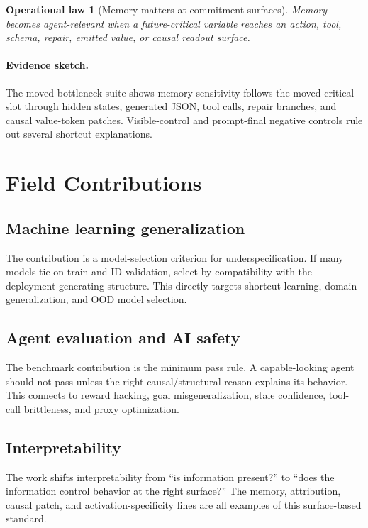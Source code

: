 \documentclass[11pt]{article}
\newtheorem{law}{Operational law}
\newenvironment{proofsketch}{\paragraph{Evidence sketch.}}{}
\begin{document}
\begin{law}[Memory matters at commitment surfaces]
Memory becomes agent-relevant when a future-critical variable reaches an
action, tool, schema, repair, emitted value, or causal readout surface.
\end{law}
\begin{proofsketch}
The moved-bottleneck suite shows memory sensitivity follows the moved critical
slot through hidden states, generated JSON, tool calls, repair branches, and
causal value-token patches. Visible-control and prompt-final negative controls
rule out several shortcut explanations.
\end{proofsketch}

\section{Field Contributions}

\subsection{Machine learning generalization}

The contribution is a model-selection criterion for underspecification. If
many models tie on train and ID validation, select by compatibility with the
deployment-generating structure. This directly targets shortcut learning,
domain generalization, and OOD model selection.

\subsection{Agent evaluation and AI safety}

The benchmark contribution is the minimum pass rule. A capable-looking agent
should not pass unless the right causal/structural reason explains its behavior.
This connects to reward hacking, goal misgeneralization, stale confidence,
tool-call brittleness, and proxy optimization.

\subsection{Interpretability}

The work shifts interpretability from ``is information present?'' to ``does the
information control behavior at the right surface?'' The memory, attribution,
causal patch, and activation-specificity lines are all examples of this
surface-based standard.
\end{document}
